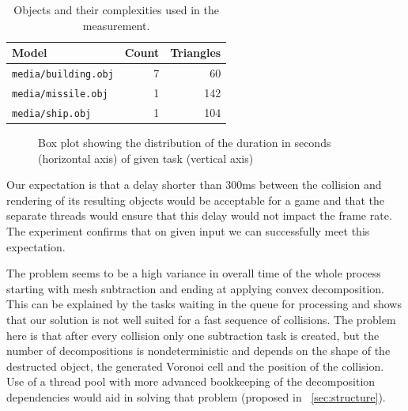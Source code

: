 \begin{table}
     \centering
\begin{tabular}{lrr}
  Model & Count & Triangles \\
  \hline
  \texttt{media/building.obj} & 7 & 60 \\
  \texttt{media/missile.obj} & 1 & 142 \\
  \texttt{media/ship.obj} & 1 & 104
\end{tabular}
\caption{Objects and their complexities used in the measurement.}
    \label{tab:objects}
\end{table}

\begin{figure}
\centering
{}
\caption{Box plot showing the distribution of the duration in seconds (horizontal axis) of given task (vertical axis)}
\label{fig:boxtimes}
\end{figure}



Our expectation is that a delay shorter than 300ms between the collision and rendering of its resulting objects would be acceptable for a game and that the separate threads would ensure that this delay would not impact the frame rate. The experiment confirms that on given input we can successfully meet this expectation.

The problem seems to be a high variance in overall time of the whole process starting with mesh subtraction and ending at applying convex decomposition. This can be explained by the tasks waiting in the queue for processing and shows that our solution is not well suited for a fast sequence of collisions. The problem here is that after every collision only one subtraction task is created, but the number of decompositions is nondeterministic and depends on the shape of the destructed object, the generated Voronoi cell and the position of the collision. Use of a thread pool with more advanced bookkeeping of the decomposition dependencies would aid in solving that problem (proposed in ~\cref{sec:structure}).

